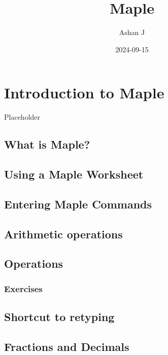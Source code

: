 \documentclass[
]{book}
\title{Maple}
\author{Ashan J}
\date{2024-09-15}
\theoremstyle{definition}
\theoremstyle{definition}
\theoremstyle{definition}
\theoremstyle{definition}
\theoremstyle{remark}
\begin{document}
\maketitle

{
\setcounter{tocdepth}{1}
\tableofcontents
}
\chapter{Introduction to Maple}\label{introduction-to-maple}

Placeholder

\section{What is Maple?}\label{what-is-maple}

\section{Using a Maple Worksheet}\label{using-a-maple-worksheet}

\section{Entering Maple Commands}\label{entering-maple-commands}

\section{Arithmetic operations}\label{arithmetic-operations}

\section{Operations}\label{operations}

\subsection{Exercises}\label{exercises}

\section{Shortcut to retyping}\label{shortcut-to-retyping}

\section{Fractions and Decimals}\label{fractions-and-decimals}
\end{document}
